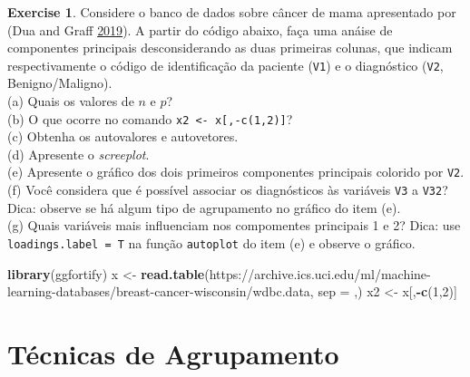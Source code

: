 \documentclass[
]{book}
\newenvironment{Shaded}{\begin{snugshade}}{\end{snugshade}}
\newcommand{\DataTypeTok}[1]{\textcolor[rgb]{0.13,0.29,0.53}{#1}}
\newcommand{\DecValTok}[1]{\textcolor[rgb]{0.00,0.00,0.81}{#1}}
\newcommand{\KeywordTok}[1]{\textcolor[rgb]{0.13,0.29,0.53}{\textbf{#1}}}
\newcommand{\NormalTok}[1]{#1}
\newcommand{\OperatorTok}[1]{\textcolor[rgb]{0.81,0.36,0.00}{\textbf{#1}}}
\newcommand{\StringTok}[1]{\textcolor[rgb]{0.31,0.60,0.02}{#1}}
\theoremstyle{definition}
\theoremstyle{definition}
\theoremstyle{definition}
\newtheorem{exercise}{Exercise}[chapter]
\theoremstyle{remark}
\begin{document}
\begin{exercise}
\protect\hypertarget{exr:unnamed-chunk-149}{}{\label{exr:unnamed-chunk-149} }Considere o banco de dados sobre câncer de mama apresentado por (Dua and Graff \protect\hyperlink{ref-dua2019uci}{2019}). A partir do código abaixo, faça uma anáise de componentes principais desconsiderando as duas primeiras colunas, que indicam respectivamente o código de identificação da paciente (\texttt{V1}) e o diagnóstico (\texttt{V2}, Benigno/Maligno).\\
(a) Quais os valores de \(n\) e \(p\)?\\
(b) O que ocorre no comando \texttt{x2\ \textless{}-\ x{[},-c(1,2){]}}?\\
(c) Obtenha os autovalores e autovetores.\\
(d) Apresente o \emph{screeplot}.\\
(e) Apresente o gráfico dos dois primeiros componentes principais colorido por \texttt{V2}.\\
(f) Você considera que é possível associar os diagnósticos às variáveis \texttt{V3} a \texttt{V32}? Dica: observe se há algum tipo de agrupamento no gráfico do item (e).\\
(g) Quais variáveis mais influenciam nos compomentes principais 1 e 2? Dica: use \texttt{loadings.label\ =\ T} na função \texttt{autoplot} do item (e) e observe o gráfico.
\end{exercise}

\begin{Shaded}
\begin{Highlighting}[]
\KeywordTok{library}\NormalTok{(ggfortify)}
\NormalTok{x \textless{}{-}}\StringTok{ }\KeywordTok{read.table}\NormalTok{(}\StringTok{\textquotesingle{}https://archive.ics.uci.edu/ml/machine{-}learning{-}databases/breast{-}cancer{-}wisconsin/wdbc.data\textquotesingle{}}\NormalTok{, }\DataTypeTok{sep =} \StringTok{\textquotesingle{},\textquotesingle{}}\NormalTok{)}
\NormalTok{x2 \textless{}{-}}\StringTok{ }\NormalTok{x[,}\OperatorTok{{-}}\KeywordTok{c}\NormalTok{(}\DecValTok{1}\NormalTok{,}\DecValTok{2}\NormalTok{)]}
\end{Highlighting}
\end{Shaded}

\hypertarget{tuxe9cnicas-de-agrupamento}{%
\section{Técnicas de Agrupamento}\label{tuxe9cnicas-de-agrupamento}}
\end{document}
